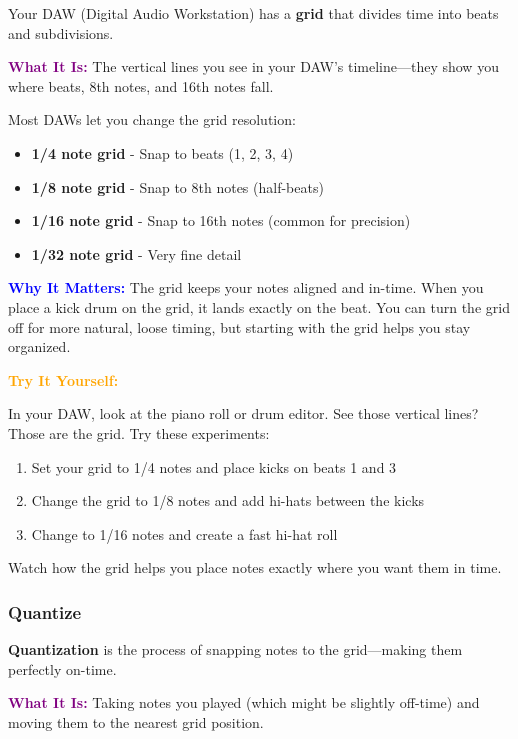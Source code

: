 \documentclass[11pt,letterpaper]{article}
\newcommand{\purple}[1]{\textcolor{purple}{\textbf{#1}}}
\newcommand{\bluepurple}[1]{\textcolor{blue}{\textbf{#1}}}
\newcommand{\orangetext}[1]{\textcolor{orange}{\textbf{#1}}}
\begin{document}
Your DAW (Digital Audio Workstation) has a \textbf{grid} that divides time into beats and subdivisions.

\textbf{\purple{What It Is:}} The vertical lines you see in your DAW's timeline—they show you where beats, 8th notes, and 16th notes fall.

Most DAWs let you change the grid resolution:
\begin{itemize}[leftmargin=*]
\item \textbf{1/4 note grid} - Snap to beats (1, 2, 3, 4)
\item \textbf{1/8 note grid} - Snap to 8th notes (half-beats)
\item \textbf{1/16 note grid} - Snap to 16th notes (common for precision)
\item \textbf{1/32 note grid} - Very fine detail
\end{itemize}

\textbf{\bluepurple{Why It Matters:}} The grid keeps your notes aligned and in-time. When you place a kick drum on the grid, it lands exactly on the beat. You can turn the grid off for more natural, loose timing, but starting with the grid helps you stay organized.

\textbf{\orangetext{Try It Yourself:}} 

In your DAW, look at the piano roll or drum editor. See those vertical lines? Those are the grid. Try these experiments:

\begin{enumerate}[leftmargin=*]
\item Set your grid to 1/4 notes and place kicks on beats 1 and 3
\item Change the grid to 1/8 notes and add hi-hats between the kicks
\item Change to 1/16 notes and create a fast hi-hat roll
\end{enumerate}

Watch how the grid helps you place notes exactly where you want them in time.

\subsubsection{Quantize}

\textbf{Quantization} is the process of snapping notes to the grid—making them perfectly on-time.

\textbf{\purple{What It Is:}} Taking notes you played (which might be slightly off-time) and moving them to the nearest grid position.
\end{document}
